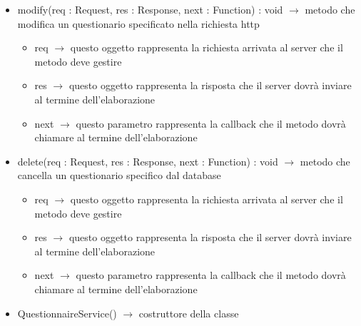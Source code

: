 \begin{description}
\begin{itemize}
	\item modify(req : Request, res : Response, next : Function) : void $\rightarrow$ metodo che modifica un questionario specificato nella richiesta http\begin{itemize}
		\item req $\rightarrow$ questo oggetto rappresenta la richiesta arrivata al server che il metodo deve gestire
		\item res $\rightarrow$ questo oggetto rappresenta la risposta che il server dovrà inviare al termine dell'elaborazione
		\item next $\rightarrow$ questo parametro rappresenta la callback che il metodo dovrà chiamare al termine dell’elaborazione
	\end{itemize}
	
	\item delete(req : Request, res : Response, next : Function) : void $\rightarrow$ metodo che cancella un questionario specifico dal database\begin{itemize}
		\item req $\rightarrow$ questo oggetto rappresenta la richiesta arrivata al server che il metodo deve gestire
		\item res $\rightarrow$ questo oggetto rappresenta la risposta che il server dovrà inviare al termine dell'elaborazione
		\item next $\rightarrow$ questo parametro rappresenta la callback che il metodo dovrà chiamare al termine dell’elaborazione
	\end{itemize}
	
	\item QuestionnaireService() $\rightarrow$ costruttore della classe
\end{itemize}

\end{description}

\vspace{0.5cm}
\hypertarget{server::service::QuestionService}{}
